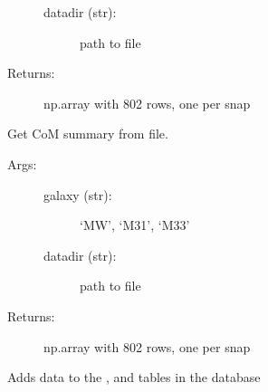 \documentclass[letterpaper,10pt,english]{sphinxmanual}
\begin{document}
\begin{fulllineitems}
\begin{fulllineitems}
\begin{description}
\begin{description}
\item[{datadir (str):}] \leavevmode
path to file

\end{description}

\item[{Returns:}] \leavevmode
np.array with 802 rows, one per snap

\end{description}

\end{fulllineitems}


\begin{fulllineitems}
\label{\detokenize{timecourse:galaxy.timecourse.TimeCourse.read_total_com_file}}
Get CoM summary from file.
\begin{description}
\item[{Args:}] \leavevmode\begin{description}
\item[{galaxy (str): }] \leavevmode
‘MW’, ‘M31’, ‘M33’

\item[{datadir (str):}] \leavevmode
path to file

\end{description}

\item[{Returns:}] \leavevmode
np.array with 802 rows, one per snap

\end{description}

\end{fulllineitems}


\begin{fulllineitems}
\label{\detokenize{timecourse:galaxy.timecourse.TimeCourse.write_db_tables}}
Adds data to the ,  and  tables in the 
 database


\end{fulllineitems}
\end{fulllineitems}
\end{document}
